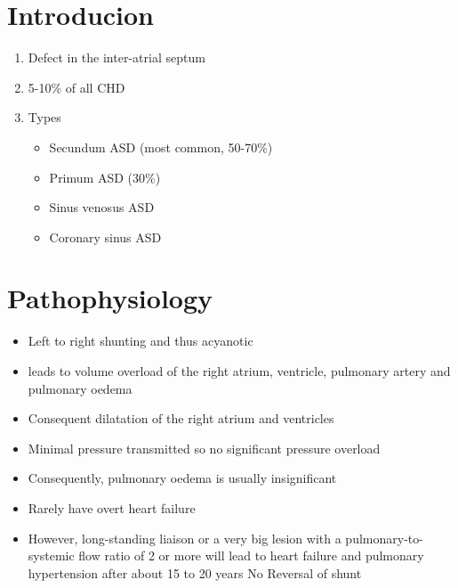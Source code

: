 \documentclass[
  letterpaper,
  DIV=11,
  numbers=noendperiod]{scrreprt}
\providecommand{\tightlist}{%
  \setlength{\itemsep}{0pt}\setlength{\parskip}{0pt}}\usepackage{longtable,booktabs,array}
\begin{document}
\hypertarget{section}{%
\section{}\label{section}}

\hypertarget{introducion}{%
\section{Introducion}\label{introducion}}

\begin{enumerate}
\def\labelenumi{\arabic{enumi}.}
\tightlist
\item
  Defect in the inter-atrial septum
\item
  5-10\% of all CHD
\item
  Types

  \begin{itemize}
  \tightlist
  \item
    Secundum ASD (most common, 50-70\%)
  \item
    Primum ASD (30\%)
  \item
    Sinus venosus ASD
  \item
    Coronary sinus ASD
  \end{itemize}
\end{enumerate}

\hypertarget{pathophysiology}{%
\section{Pathophysiology}\label{pathophysiology}}

\begin{itemize}
\tightlist
\item
  Left to right shunting and thus acyanotic
\item
  leads to volume overload of the right atrium, ventricle, pulmonary
  artery and pulmonary oedema
\item
  Consequent dilatation of the right atrium and ventricles
\item
  Minimal pressure transmitted so no significant pressure overload
\item
  Consequently, pulmonary oedema is usually insignificant
\item
  Rarely have overt heart failure
\item
  However, long-standing liaison or a very big lesion with a
  pulmonary-to-systemic flow ratio of 2 or more will lead to heart
  failure and pulmonary hypertension after about 15 to 20 years No
  Reversal of shunt
\end{itemize}
\end{document}
